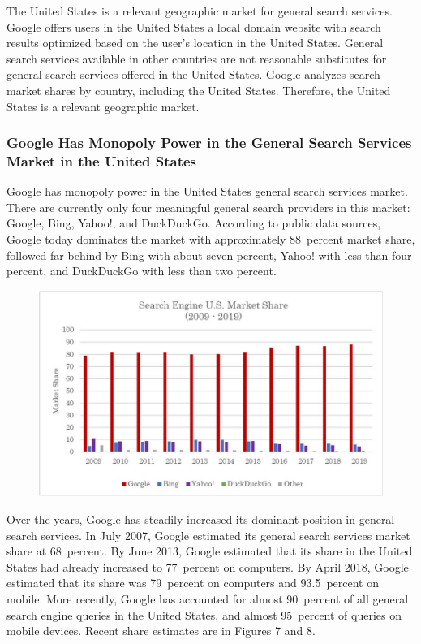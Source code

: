 \documentclass[11pt,b5paper,headings=small]{scrartcl}
\begin{document}

The United States is a relevant geographic market for general search services.
Google offers users in the United States a local domain website with search results optimized
based on the user’s location in the United States. General search services available in other
countries are not reasonable substitutes for general search services offered in the United States.
Google analyzes search market shares by country, including the United States. Therefore, the
United States is a relevant geographic market.




\subsubsection{Google Has Monopoly Power in the General Search Services Market in
the United States}
Google has monopoly power in the United States general search services market.
There are currently only four meaningful general search providers in this market: Google, Bing,
Yahoo!, and DuckDuckGo. According to public data sources, Google today dominates the
market with approximately 88~percent market share, followed far behind by Bing with about
seven percent, Yahoo! with less than four percent, and DuckDuckGo with less than two percent.
\begin{figure}
\caption{}
\includegraphics{US-v-Google-Complaint-figures/fig6.png}
\end{figure}


Over the years, Google has steadily increased its dominant position in general
search services. In July 2007, Google estimated its general search services market share at
68~percent. By June 2013, Google estimated that its share in the United States had already
increased to 77~percent on computers. By April 2018, Google estimated that its share was
79~percent on computers and 93.5~percent on mobile. More recently, Google has accounted for
almost 90~percent of all general search engine queries in the United States, and almost 95~percent
of queries on mobile devices. Recent share estimates are in Figures 7 and 8.
\end{document}
